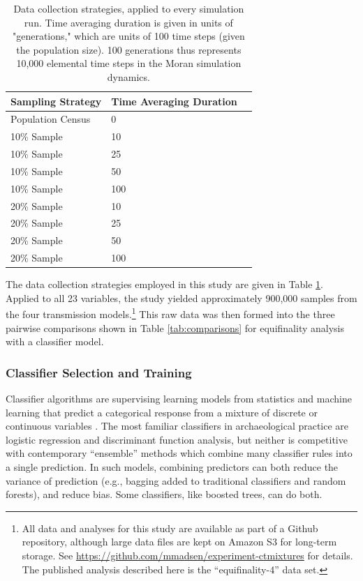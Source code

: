 \begin{table}[ht]
    \begin{tabular}{lll}
        \hline
        Sampling Strategy & Time Averaging Duration \\ 
        \hline
        Population Census & 0 \\
        10\% Sample & 10 \\
        10\% Sample & 25  \\
        10\% Sample & 50 \\
        10\% Sample & 100 \\
        20\% Sample & 10  \\
        20\% Sample & 25 \\
        20\% Sample & 50 \\
        20\% Sample & 100 \\
        \hline
    \end{tabular}
    \caption{Data collection strategies, applied to every simulation run.  Time averaging duration is given in units of "generations," which are units of 100 time steps (given the population size).  100 generations thus represents 10,000 elemental time steps in the Moran simulation dynamics.}
    \label{tab:measurement-strategies}
\end{table}

The data collection strategies employed in this study are given in Table \ref{tab:measurement-strategies}.  Applied to all 23 variables, the study yielded approximately 900,000 samples from the four transmission models.\footnote{All data and analyses for this study are available as part of a Github repository, although large data files are kept on Amazon S3 for long-term storage.  See \url{https://github.com/mmadsen/experiment-ctmixtures} for details.  The published analysis described here is the ``equifinality-4'' data set.}  This raw data was then formed into the three pairwise comparisons shown in Table \ref{tab:comparisons} for equifinality analysis with a classifier model.

\subsubsection{Classifier Selection and
Training}\label{classifier-selection-and-training}

Classifier algorithms are supervising learning models from statistics
and machine learning that predict a categorical response from a mixture
of discrete or continuous variables \cite{hastie2009elements}. The most
familiar classifiers in archaeological practice are logistic regression
and discriminant function analysis, but neither is competitive with
contemporary ``ensemble'' methods which combine many classifier rules
into a single prediction. In such models, combining predictors can both
reduce the variance of prediction (e.g., bagging added to traditional
classifiers and random forests), and
reduce bias.  Some classifiers, like boosted trees, can do both.

